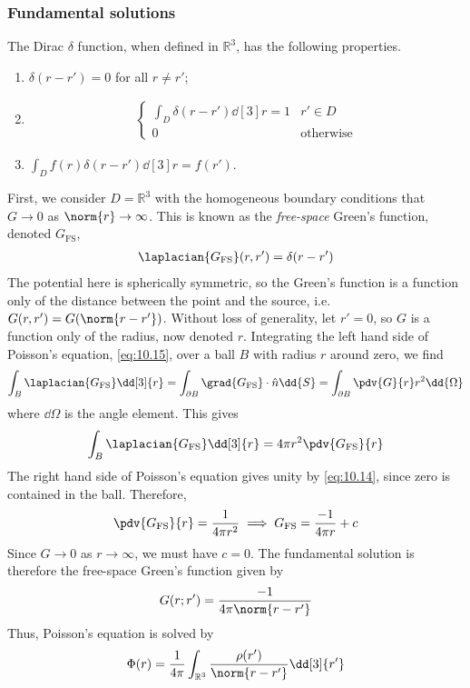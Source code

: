 \subsubsection{Fundamental solutions}
The Dirac $\delta$ function, when defined in $\mathbb R^3$, has the following properties.
\begin{enumerate}
	\item $\delta(r - r') = 0$ for all $r \neq r'$;
	\item \begin{align} \label{eq:10.14}
		\begin{cases}
			\int_D \delta(r - r') \dd[3]{r} = 1 & r' \in D \\
			0 & \text{otherwise}
		\end{cases} 
	\end{align} 
	\item $\int_D f(r) \delta(r - r') \dd[3]{r} = f(r')$.
\end{enumerate}
First, we consider $D = \mathbb R^3$ with the homogeneous boundary conditions that $G \to 0$ as $\norm{r} \to \infty$.
This is known as the \textit{free-space} Green's function, denoted $G_{\mathrm{FS}}$,
\begin{align} \label{eq:10.15}
	\laplacian{G_{\mathrm{FS}}}(r, r') = \delta(r - r')
\end{align} 
The potential here is spherically symmetric, so the Green's function is a function only of the distance between the point and the source, i.e. $G(r, r') = G(\norm{r - r'})$.
Without loss of generality, let $r' = 0$, so $G$ is a function only of the radius, now denoted $r$.
Integrating the left hand side of Poisson's equation, \cref{eq:10.15}, over a ball $B$ with radius $r$ around zero, we find
\begin{align*}
	\int_B \laplacian{G_{\mathrm{FS}}} \dd[3]{r} = \int_{\partial B} \grad{G_{\mathrm{FS}}} \cdot \hat n \dd{S} = \int_{\partial B} \pdv{G}{r} r^2 \dd{\Omega}
\end{align*}
where $\dd{\Omega}$ is the angle element.
This gives
\begin{align*}
	\int_B \laplacian{G_{\mathrm{FS}}} \dd[3]{r} = 4 \pi r^2 \pdv{G_{\mathrm{FS}}}{r}
\end{align*}
The right hand side of Poisson's equation gives unity by \cref{eq:10.14}, since zero is contained in the ball.
Therefore,
\begin{align*}
	\pdv{G_{\mathrm{FS}}}{r} = \frac{1}{4 \pi r^2} \implies G_{\mathrm{FS}} = \frac{-1}{4 \pi r} + c
\end{align*}
Since $G \to 0$ as $r \to \infty$, we must have $c = 0$.
The fundamental solution is therefore the free-space Green's function given by
\begin{align} \label{eq:10.16}
	G(r; r') = \frac{-1}{4 \pi \norm{r - r'}}
\end{align}
Thus, Poisson's equation is solved by
\begin{align*}
	\Phi(r) = \frac{1}{4 \pi} \int_{\mathbb R^3} \frac{\rho(r')}{\norm{r - r'}} \dd[3]{r'}
\end{align*}

